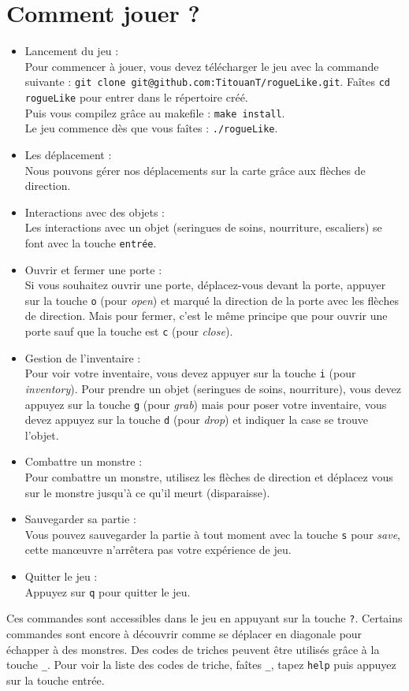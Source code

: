 \documentclass[11pt]{report}
\begin{document}
	\section{Comment jouer ?}
		\begin{itemize}
			\item{Lancement du jeu : \\}
				Pour commencer à jouer, vous devez télécharger le jeu avec la commande suivante : \texttt{git clone git@github.com:TitouanT/rogueLike.git}.
				Faîtes \texttt{cd rogueLike} pour entrer dans le répertoire créé. \\
				Puis vous compilez grâce au makefile : \texttt{make install}. \\
				Le jeu commence dès que vous faîtes : \texttt{./rogueLike}.	
			\item{Les déplacement : \\}
				Nous pouvons gérer nos déplacements sur la carte grâce aux flèches de direction. 
			\item{Interactions avec des objets : \\}	
				Les interactions avec un objet (seringues de soins, nourriture, escaliers) se font avec la touche \texttt{entrée}.
			\item{Ouvrir et fermer une porte :\\}	
				Si vous souhaitez ouvrir une porte, déplacez-vous devant la porte, appuyer sur la touche \texttt{o} (pour \emph{open}) et marqué la direction de la porte avec les flèches de direction.
				Mais pour fermer, c'est le même principe que pour ouvrir une porte sauf que la touche est \texttt{c} (pour \emph{close}).
			\item{Gestion de l'inventaire : \\}
				Pour voir votre inventaire, vous devez appuyer sur la touche \texttt{i} (pour \emph{inventory}). Pour prendre un objet (seringues de soins, nourriture), vous devez appuyez sur la touche \texttt{g} (pour \emph{grab}) mais pour poser votre inventaire, vous devez appuyez sur la touche \texttt{d} (pour \emph{drop}) et indiquer la case se trouve l'objet.
			\item{Combattre un monstre :\\}
				Pour combattre un monstre, utilisez les flèches de direction et déplacez vous sur le monstre jusqu'à ce qu'il meurt (disparaisse).
			\item{Sauvegarder sa partie :\\}
				Vous pouvez sauvegarder la partie à tout moment avec la touche \texttt{s} pour \emph{save}, cette manœuvre n'arrêtera pas votre expérience de jeu.
			\item{Quitter le jeu :\\}
				Appuyez sur \texttt{q} pour quitter le jeu.
		\end{itemize}
		Ces commandes sont accessibles dans le jeu en appuyant sur la touche \texttt{?}.
		Certains commandes sont encore à découvrir comme se déplacer en diagonale pour échapper à des monstres. Des codes de triches peuvent être utilisés grâce à la touche \texttt{\_}. Pour voir la liste des codes de triche, faîtes \texttt{\_}, tapez \texttt{help} puis appuyez sur la touche entrée.
		
\end{document}
